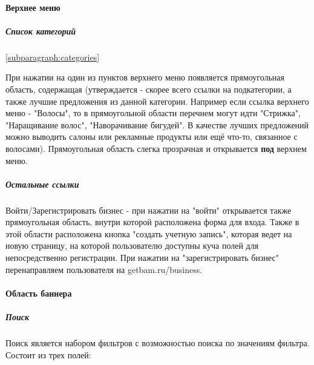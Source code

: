 \documentclass[DIV=calc, paper=a4, fontsize=11pt]{scrartcl} %
\begin{document}
\paragraph{Верхнее меню}

\subparagraph{Список категорий} \ref{subparagraph:categories}

При нажатии на один из пунктов верхнего меню появляется прямоугольная область, содержащая (утверждается - скорее всего ссылки на подкатегории, а также лучшие предложения из данной категории. Например если ссылка верхнего меню - "Волосы", то в прямоугольной области перечнем могут идти "Стрижка", "Наращивание волос", "Наворачивание бигудей". В качестве лучших предложений можно выводить салоны или рекламные продукты или ещё что-то, связанное с волосами). Прямоугольная область слегка прозрачная и открывается \textbf{под} верхнем меню. 

\subparagraph{Остальные ссылки}

Войти/Зарегистрировать бизнес - при нажатии на "войти" открывается также прямоугольная область, внутри которой расположена форма для входа. Также в этой области расположена кнопка "создать учетную запись", которая ведет на новую страницу, на которой пользователю доступны куча полей для непосредственно регистрации.
При нажатии на "зарегистрировать бизнес" перенаправляем пользователя на getbam.ru/business.

\paragraph{Область баннера}
\subparagraph{Поиск} Поиск является набором фильтров с возможностью поиска по значениям фильтра. Состоит из трех полей:
\end{document}
